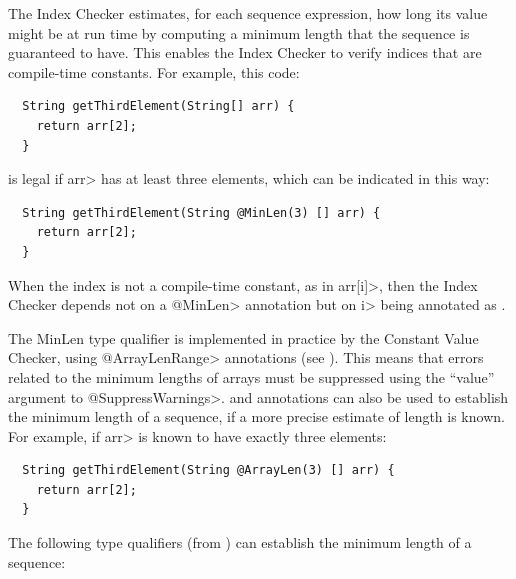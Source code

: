 
The Index Checker estimates, for each sequence expression, how long its value
might be at run time by computing a minimum length that
the sequence is guaranteed to have.  This enables the Index Checker to
verify indices that are compile-time constants.  For example, this code:

\begin{Verbatim}
  String getThirdElement(String[] arr) {
    return arr[2];
  }
\end{Verbatim}

\noindent
is legal if \<arr> has at least three elements, which can be indicated
in this way:

\begin{Verbatim}
  String getThirdElement(String @MinLen(3) [] arr) {
    return arr[2];
  }
\end{Verbatim}

When the index is not a compile-time constant, as in \<arr[i]>, then the
Index Checker depends not on a \<@MinLen> annotation but on \<i> being
annotated as
.

The MinLen type qualifier is implemented in practice by the Constant Value Checker,
using \<@ArrayLenRange> annotations (see ).
This means that errors related to the minimum lengths of arrays must be suppressed using
the ``value'' argument to \<@SuppressWarnings>.
 and 
annotations can also be used to establish the minimum length of a sequence, if a
more precise estimate of length is known. For example,
if \<arr> is known to have exactly three elements:

\begin{Verbatim}
  String getThirdElement(String @ArrayLen(3) [] arr) {
    return arr[2];
  }
\end{Verbatim}

The following type qualifiers (from )
can establish the minimum length of a sequence:

